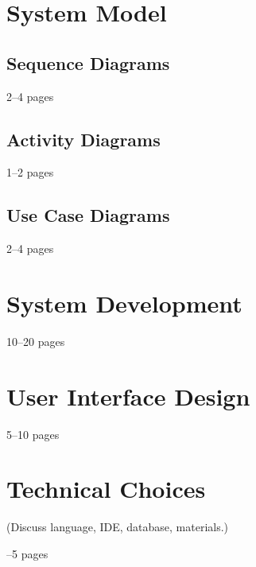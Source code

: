 \begin{chapterpage} %
\end{chapterpage}
\section{System Model}
\subsection{Sequence Diagrams}
2--4 pages
\subsection{Activity Diagrams}
1--2 pages
\subsection{Use Case Diagrams}
2--4 pages

\section{System Development}
10--20 pages

\section{User Interface Design}
5--10 pages

\section{Technical Choices}
(Discuss language, IDE, database, materials.)

--5 pages
